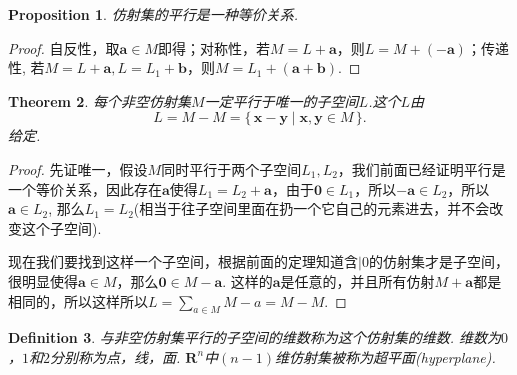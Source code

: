 \documentclass{article}
\newtheorem{theorem}{Theorem}[section]
\newtheorem{proposition}[theorem]{Proposition}
\newtheorem{definition}[theorem]{Definition}
\newcommand\Set[2]{\{\,#1\mid#2\,\}} %
\newcommand{\vect}[1]{\mathbf{#1}} %
\newcommand{\thereal}{\mathbf{R}} %
\begin{document}
\begin{proposition}
\rm 仿射集的平行是一种{\color{red}等价关系}.
\end{proposition}

\begin{proof}
自反性，取$\vect{a} \in M$即得；对称性，若$M = L + \vect{a}$，则$L = M + (-\vect{a})$；传递性, 若$M = L + \vect{a},L = L_1 + \vect{b}$，则$M = L_1 + (\vect{a}+\vect{b})$.
\end{proof}

\begin{theorem}
\rm 每个非空仿射集$M$一定平行于唯一的子空间$L$.这个$L$由
$$
L = M-M = \Set{\vect{x}-\vect{y}}{\vect{x},\vect{y} \in M}.
$$
给定.
\end{theorem}

\begin{proof}
先证{\color{blue}唯一}，假设$M$同时平行于两个子空间$L_1,L_2$，我们前面已经证明平行是一个等价关系，因此存在$\vect{a}$使得$L_1 = L_2 + \vect{a}$，由于$\vect{0} \in L_1$，所以$\vect{-a} \in L_2$，所以$\vect{a} \in L_2$, 那么$L_1 = L_2$(相当于往子空间里面在扔一个它自己的元素进去，并不会改变这个子空间). 

现在我们要{\color{blue}找到这样一个子空间}，根据前面的定理知道含$\vert{0}$的仿射集才是子空间，很明显使得$\vect{a} \in M$，那么$\vect{0} \in M-\vect{a}$. 这样的$\vect{a}$是任意的，并且所有仿射$M+\vect{a}$都是相同的，所以这样所以$L =\sum_{a \in M} M-a = M-M$.
\end{proof}

\begin{definition}
\rm 与非空仿射集平行的子空间的维数称为这个仿射集的{\color{red}维数}. 维数为$0$，$1$和$2$分别称为点，线，面. $\thereal^n$中$(n-1)$维仿射集被称为{\color{red}超平面}(hyperplane).
\end{definition}
\end{document}
